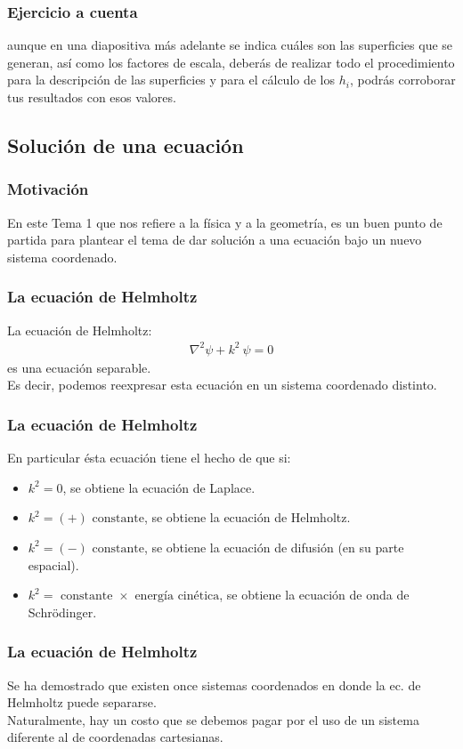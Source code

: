 \documentclass[12pt]{beamer}
\begin{document}
\begin{frame}
\frametitle{Ejercicio a cuenta}
 aunque en una diapositiva más adelante se indica cuáles son las superficies que se generan, así como los factores de escala, deberás de realizar todo el procedimiento para la descripción de las superficies y para el cálculo de los $h_{i}$, podrás corroborar tus resultados con esos valores.
\end{frame}

\subsection{Solución de una ecuación}

\begin{frame}
\frametitle{Motivación}
En este Tema 1 que nos refiere a la física y a la geometría, es un buen punto de partida para plantear el tema de dar solución a una ecuación bajo un nuevo sistema coordenado.
\end{frame}
\begin{frame}
\frametitle{La ecuación de Helmholtz}
La ecuación de Helmholtz:
\pause
\begin{align*}
\nabla^{2} \psi + k^{2} \: \psi = 0
\end{align*}
es una ecuación separable.
\\
\bigskip
\pause
Es decir, podemos reexpresar esta ecuación en un sistema coordenado distinto.
\end{frame}
\begin{frame}
\frametitle{La ecuación de Helmholtz}
En particular ésta ecuación tiene el hecho de que si:
\pause
\begin{itemize}[<+->]
\item[\ding{212}] $k^{2} = 0$, se obtiene la ecuación de Laplace.
\item[\ding{212}] $k^{2} = (+) \mbox{ constante}$, se obtiene la ecuación de Helmholtz.
\item[\ding{212}] $k^{2} = (-) \mbox{ constante}$, se obtiene la ecuación de difusión (en su parte espacial).
\item[\ding{212}] $k^{2} = \mbox{ constante } \times \mbox{ energía cinética}$, se obtiene la ecuación de onda de Schrödinger.
\end{itemize}
\end{frame}
\begin{frame}
\frametitle{La ecuación de Helmholtz}
Se ha demostrado que existen once sistemas coordenados en donde la ec. de Helmholtz puede separarse. 
\\
\bigskip
\pause
Naturalmente, hay un costo que se debemos pagar por el uso de un sistema diferente al de coordenadas cartesianas.
\end{frame}
\end{document}
